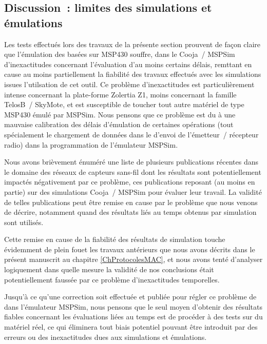\subsection{Discussion~: limites des simulations et émulations}
\label{SubsecDiscussLimSimuEmu}

Les tests effectués lors des travaux de la présente section prouvent de
façon claire que l'émulation des  basées sur MSP430 souffre,
dans le  Cooja~/ MSPSim d'inexactitudes concernant
l'évaluation d'au moins certains délais, remttant en cause au moins
partiellement la fiabilité des travaux effectués avec les simulations issues
l'utilsation de cet outil. Ce problème d'inexactitudes est particulièrement
intense concernant la plate-forme Zolertia Z1, moins concernant la famille
TelosB~/ SkyMote, et est susceptible de toucher tout autre matériel de type
MSP430 émulé par MSPSim. Nous pensons que ce problème est du à une mauvaise
calibration des délais d'émulation de certaines opérations (tout spécialement
le chargement de données dans le  d'envoi de l'émetteur~/
récepteur radio) dans la programmation de l'émulateur MSPSim.

Nous avons brièvement énuméré une liste de plusieurs publications récentes
dans le domaine des réseaux de capteurs sans-fil dont les résultats sont
potentiellement impactés négativement par ce problème, ces publications
reposant (au moins en partie) sur des simulations Cooja~/ MSPSim pour
évaluer leur travail. La validité de telles publications peut être
remise en cause par le problème que nous venons de décrire, notamment
quand des résultats liés au temps obtenus par simulation sont utilisés.

Cette remise en cause de la fiabilité des résultats de simulation touche
évidemment de plein fouet les travaux antérieurs que nous avons décrits dans
le présent manuscrit au chapitre \ref{ChProtocolesMAC}, et nous avons tenté
d'analyser logiquement dans quelle mesure la validité de nos conclusions
était potentiellement faussée par ce problème d'inexactitudes temporelles.

\medskip

Jusqu'à ce qu'une correction soit effectuée et publiée pour régler ce
problème de  dans l'émulateur MSPSim, nous pensons que le
seul moyen d'obtenir des résultats fiables concernant les évaluations
liées au temps est de procéder à des tests sur du matériel réel,
ce qui éliminera tout biais potentiel pouvant être introduit par
des erreurs ou des inexactitudes dues aux simulations et émulations.

